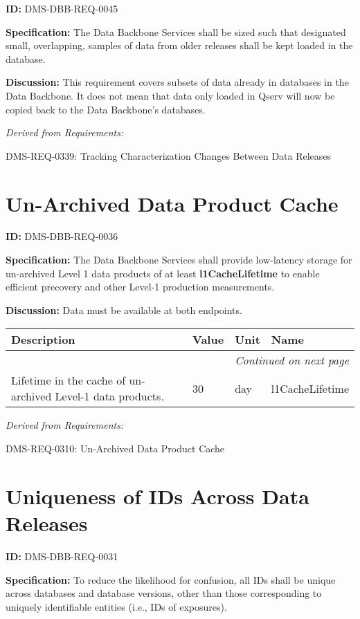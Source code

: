 \documentclass[SE,toc,lsstdraft]{lsstdoc}
\makeatletter
\newcommand{\paramname}[1]{\hspace{0pt}#1}
\newcommand{\unitname}[1]{\hspace{0pt}#1}
\newenvironment{parameters}[0]{%
\setlength\LTleft{0pt}
\setlength\LTright{\fill}
\begin{small}
\begin{longtable}[]{|p{0.49\textwidth}|l|p{0.6in}|p{1.70in}@{}|}

\hline \textbf{Description} & \textbf{Value} & \textbf{Unit} & \textbf{Name} \\ \hline
\endhead

\hline \multicolumn{4}{r}{\emph{Continued on next page}} \\
\endfoot

\hline\hline
\endlastfoot
}{%
\hline
\end{longtable}
\end{small}
}
\makeatother
\begin{document}
\label{DMS-DBB-REQ-0045}
\textbf{ID:} DMS-DBB-REQ-0045

\textbf{Specification:}
The Data Backbone Services shall be sized such that designated small, overlapping, samples of data from older releases shall be kept loaded in the database.

\textbf{Discussion:}
This requirement covers subsets of data already in databases in the Data Backbone.    It does not mean that data only loaded in Qserv will now be copied back to the Data Backbone's databases.

\emph{Derived from Requirements:}

DMS-REQ-0339:
Tracking Characterization Changes Between Data Releases \newline

\section{Un-Archived Data Product Cache}

\label{DMS-DBB-REQ-0036}
\textbf{ID:} DMS-DBB-REQ-0036

\textbf{Specification:}
The Data Backbone Services shall provide low-latency storage for un-archived Level 1 data products of at least \textbf{l1CacheLifetime} to enable efficient precovery and other Level-1 production measurements.

\textbf{Discussion:}
Data must be available at both endpoints.

\begin{parameters}
Lifetime in the cache of un-archived Level-1 data products.
&
30
&
\unitname{%
day
}
&
\paramname{%
l1CacheLifetime
} \\\hline
\end{parameters}

\emph{Derived from Requirements:}

DMS-REQ-0310:
Un-Archived Data Product Cache \newline

\section{Uniqueness of IDs Across Data Releases}

\label{DMS-DBB-REQ-0031}
\textbf{ID:} DMS-DBB-REQ-0031

\textbf{Specification:}
To reduce the likelihood for confusion, all IDs shall be unique across databases and database versions, other than those corresponding to uniquely identifiable entities (i.e., IDs of exposures).
\end{document}
